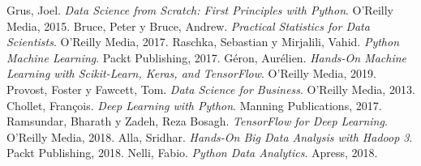 \documentclass[conference]{IEEEtran}
\begin{document}
\begin{thebibliography}{00}
     Grus, Joel. \textit{Data Science from Scratch: First Principles with Python}. O'Reilly Media, 2015.
     Bruce, Peter y Bruce, Andrew. \textit{Practical Statistics for Data Scientists}. O'Reilly Media, 2017.
     Raschka, Sebastian y Mirjalili, Vahid. \textit{Python Machine Learning}. Packt Publishing, 2017.
     Géron, Aurélien. \textit{Hands-On Machine Learning with Scikit-Learn, Keras, and TensorFlow}. O'Reilly Media, 2019.
     Provost, Foster y Fawcett, Tom. \textit{Data Science for Business}. O'Reilly Media, 2013.
     Chollet, François. \textit{Deep Learning with Python}. Manning Publications, 2017.
     Ramsundar, Bharath y Zadeh, Reza Bosagh. \textit{TensorFlow for Deep Learning}. O'Reilly Media, 2018.
     Alla, Sridhar. \textit{Hands-On Big Data Analysis with Hadoop 3}. Packt Publishing, 2018.
     Nelli, Fabio. \textit{Python Data Analytics}. Apress, 2018.
\end{thebibliography}
\end{document}
